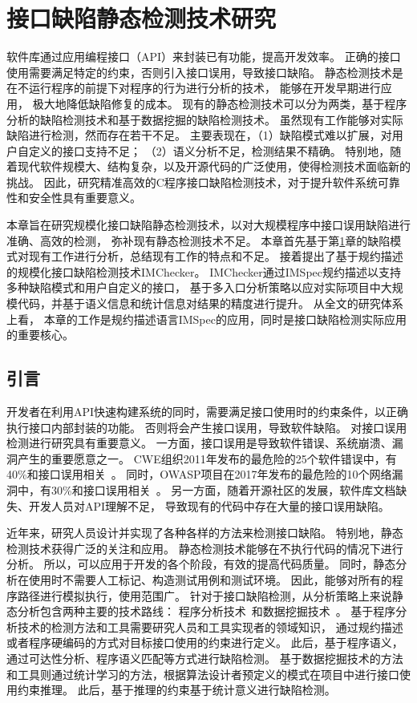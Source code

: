 \chapter{接口缺陷静态检测技术研究}
\label{cha:imchecker}
软件库通过应用编程接口（API）来封装已有功能，提高开发效率。
正确的接口使用需要满足特定的约束，否则引入接口误用，导致接口缺陷。
静态检测技术是在不运行程序的前提下对程序的行为进行分析的技术，
能够在开发早期进行应用，
极大地降低缺陷修复的成本。
现有的静态检测技术可以分为两类，基于程序分析的缺陷检测技术和基于数据挖掘的缺陷检测技术。
虽然现有工作能够对实际缺陷进行检测，然而存在若干不足。
主要表现在，（1）缺陷模式难以扩展，对用户自定义的接口支持不足；
（2）语义分析不足，检测结果不精确。
特别地，随着现代软件规模大、结构复杂，以及开源代码的广泛使用，使得检测技术面临新的挑战。
因此，研究精准高效的C程序接口缺陷检测技术，对于提升软件系统可靠性和安全性具有重要意义。

本章旨在研究规模化接口缺陷静态检测技术，以对大规模程序中接口误用缺陷进行准确、高效的检测，
弥补现有静态检测技术不足。
本章首先基于第\ref{cha:imchecker}章的缺陷模式对现有工作进行分析，总结现有工作的特点和不足。
接着提出了基于规约描述的规模化接口缺陷检测技术IMChecker。
IMChecker通过IMSpec规约描述以支持多种缺陷模式和用户自定义的接口，
基于多入口分析策略以应对实际项目中大规模代码，并基于语义信息和统计信息对结果的精度进行提升。
从全文的研究体系上看，
本章的工作是规约描述语言IMSpec的应用，同时是接口缺陷检测实际应用的重要核心。

\section{引言}
开发者在利用API快速构建系统的同时，需要满足接口使用时的约束条件，以正确执行接口内部封装的功能。
否则将会产生接口误用，导致软件缺陷。
对接口误用检测进行研究具有重要意义。
一方面，接口误用是导致软件错误、系统崩溃、漏洞产生的重要愿意之一。
CWE组织2011年发布的最危险的25个软件错误中，有40\%和接口误用相关~\cite{cwe-top25}。
同时，OWASP项目在2017年发布的最危险的10个网络漏洞中，有30\%和接口误用相关~\cite{owasp-top10}。
另一方面，随着开源社区的发展，软件库文档缺失、开发人员对API理解不足，
导致现有的代码中存在大量的接口误用缺陷。

近年来，研究人员设计并实现了各种各样的方法来检测接口缺陷。
特别地，静态检测技术获得广泛的关注和应用。
静态检测技术能够在不执行代码的情况下进行分析。
所以，可以应用于开发的各个阶段，有效的提高代码质量。
同时，静态分析在使用时不需要人工标记、构造测试用例和测试环境。
因此，能够对所有的程序路径进行模拟执行，使用范围广。
针对于接口缺陷检测，从分析策略上来说静态分析包含两种主要的技术路线：
程序分析技术~\cite{16-saner-evaluation}和数据挖掘技术~\cite{survey18}。
基于程序分析技术的检测方法和工具需要研究人员和工具实现者的领域知识，
通过规约描述或者程序硬编码的方式对目标接口使用的约束进行定义。
此后，基于程序语义，通过可达性分析、程序语义匹配等方式进行缺陷检测。
基于数据挖掘技术的方法和工具则通过统计学习的方法，根据算法设计者预定义的模式在项目中进行接口使用约束推理。
此后，基于推理的约束基于统计意义进行缺陷检测。


